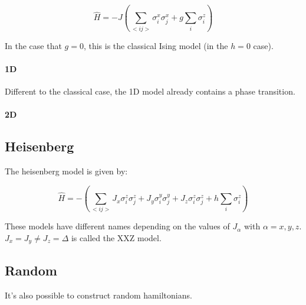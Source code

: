 \begin{equation}
    \hat{H} = -J \left (  \sum_{<i j>} \sigma^x_i \sigma^x_j + g \sum_i \sigma^z_i \right )
\end{equation}

In the case that $g=0$, this is the classical Ising model (in the $h=0$ case).

\paragraph{1D}
Different to the classical case, the 1D model already contains a phase transition.

\paragraph{2D}

\subsection{Heisenberg}

The heisenberg model is given by:

\begin{equation}
    \hat{H} =  -\left( \sum_{<i j>} J_x \sigma^z_i \sigma^z_j + J_y \sigma^y_i \sigma^y_j+ J_z \sigma^z_i \sigma^z_j + h \sum_i \sigma^z_i \right )
\end{equation}

These models have different names depending on the values of $J_{\alpha} $ with $\alpha=x,y,z$. $J_x = J_y \neq J_z = \Delta$ is called the XXZ model.

\subsection{Random}
It's also possible to construct random hamiltonians. 